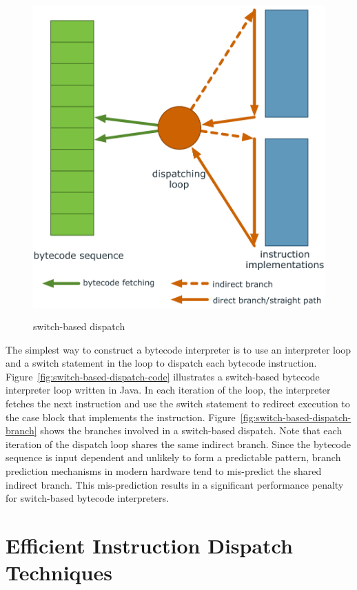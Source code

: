 \begin{figure}[th]
{  \includegraphics[scale=.47]{figures/ch2-switch-based-dispatch-branch.pdf}
  \label{fig:switch-based-dispatch-branch}
}
\caption{switch-based dispatch}
\label{fig:switch-based-dispatch}
\end{figure}

The simplest way to construct a bytecode interpreter is to use an interpreter loop and a switch statement in the loop to dispatch each bytecode instruction.
Figure~\ref{fig:switch-based-dispatch-code} illustrates a switch-based bytecode interpreter loop written in Java.
In each iteration of the loop, the interpreter fetches the next instruction and use the switch statement to redirect execution to the case block that implements the instruction.
Figure~\ref{fig:switch-based-dispatch-branch} shows the branches involved in a switch-based dispatch.
Note that each iteration of the dispatch loop shares the same indirect branch.
Since the bytecode sequence is input dependent and unlikely to form a predictable pattern,
branch prediction mechanisms in modern hardware tend to mis-predict the shared indirect branch.
This mis-prediction results in a significant performance penalty for switch-based bytecode interpreters.

\section{Efficient Instruction Dispatch Techniques}
\label{sec:efficient-instruction-dispatch-techniques}

